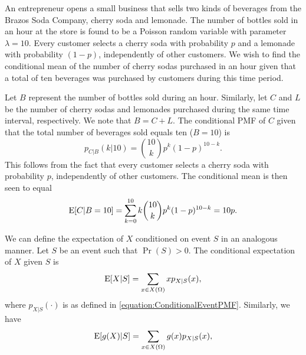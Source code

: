 \begin{example}
An entrepreneur opens a small business that sells two kinds of beverages from the Brazos Soda Company, cherry soda and lemonade.
The number of bottles sold in an hour at the store is found to be a Poisson random variable with parameter $\lambda = 10$.
Every customer selects a cherry soda with probability $p$ and a lemonade with probability $(1 - p)$, independently of other customers.
We wish to find the conditional mean of the number of cherry sodas purchased in an hour given that a total of ten beverages was purchased by customers during this time period.

Let $B$ represent the number of bottles sold during an hour.
Similarly, let $C$ and $L$ be the number of cherry sodas and lemonades purchased during the same time interval, respectively.
We note that $B = C + L$.
The conditional PMF of $C$ given that the total number of beverages sold equals ten ($B = 10$) is
\begin{equation} \label{equation:ConditionalPoisson}
p_{C|B} (k | 10)
= \binom{10}{k} p^k (1-p)^{10-k} .
\end{equation}
This follows from the fact that every customer selects a cherry soda with probability $p$, independently of other customers.
The conditional mean is then seen to equal
\begin{equation*}
\mathrm{E} [ C | B=10] = \sum_{k=0}^{10}
k \binom{10}{k} p^k (1-p)^{10-k} = 10 p .
\end{equation*}
\end{example}

We can define the expectation of $X$ conditioned on event $S$ in an analogous manner.
Let $S$ be an event such that $\Pr (S) > 0$.
The conditional expectation of $X$ given $S$ is
\begin{equation*}
\mathrm{E} [X | S] = \sum_{x \in X(\Omega)} x p_{X|S} (x) ,
\end{equation*}
where $p_{X|S} (\cdot)$ is as defined in \eqref{equation:ConditionalEventPMF}.
Similarly, we have
\begin{equation*}
\mathrm{E} [g(X) | S] = \sum_{x \in X(\Omega)} g(x) p_{X|S} (x) ,
\end{equation*}

